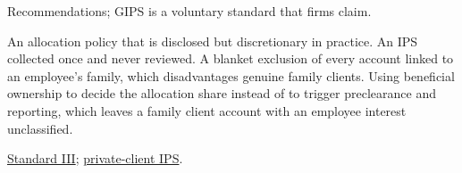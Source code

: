 \begin{qfmethod}
 Recommendations; GIPS is a voluntary standard that firms claim.

 An allocation policy that is disclosed but discretionary in practice. An IPS collected once and never reviewed. A blanket exclusion of every account linked to an employee's family, which disadvantages genuine family clients. Using beneficial ownership to decide the allocation share instead of to trigger preclearance and reporting, which leaves a family client account with an employee interest unclassified.

 \hyperref[rule:standard-duties-to-clients]{Standard III}; \hyperref[meth:private-client-ips]{private-client IPS}.

\end{qfmethod}

